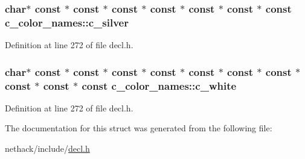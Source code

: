 \hypertarget{structc__color__names_a8b7d0126104a6ce50e78fe2e2298b08c}{
\subsubsection[{c\+\_\+silver}]{ char$\ast$ {\bf const} $\ast$ {\bf const} $\ast$ {\bf const} $\ast$ {\bf const} $\ast$ {\bf const} $\ast$ {\bf const} $\ast$ {\bf const} c\+\_\+color\+\_\+names\+::c\+\_\+silver}}\label{structc__color__names_a8b7d0126104a6ce50e78fe2e2298b08c}


Definition at line 272 of file decl.\+h.

\hypertarget{structc__color__names_a7a0c40cb90968c45ecf58835f2d44114}{
\subsubsection[{c\+\_\+white}]{ char$\ast$ {\bf const} $\ast$ {\bf const} $\ast$ {\bf const} $\ast$ {\bf const} $\ast$ {\bf const} $\ast$ {\bf const} $\ast$ {\bf const} $\ast$ {\bf const} $\ast$ {\bf const} $\ast$ {\bf const} c\+\_\+color\+\_\+names\+::c\+\_\+white}}\label{structc__color__names_a7a0c40cb90968c45ecf58835f2d44114}


Definition at line 272 of file decl.\+h.



The documentation for this struct was generated from the following file\+:\begin{DoxyCompactItemize}
\item 
nethack/include/\hyperlink{decl_8h}{decl.\+h}\end{DoxyCompactItemize}

